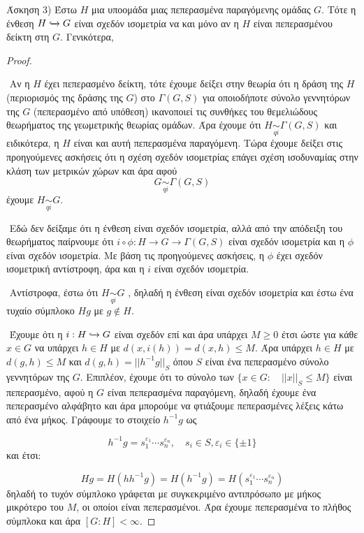 \documentclass[oneside,a4paper]{article}
\begin{document}
\noindent Άσκηση 3) Έστω $H$ μια υποομάδα μιας πεπερασμένα παραγόμενης ομάδας $G$. Τότε η ένθεση $H\xhookrightarrow{} G$ είναι σχεδόν ισομετρία να και μόνο αν η $H$ είναι πεπερασμένου δείκτη στη $G$. Γενικότερα,

\begin{proof} $ $

$ $\newline
Αν η $H$ έχει πεπερασμένο δείκτη, τότε έχουμε δείξει στην θεωρία ότι η δράση της $H$ (περιορισμός της δράσης της $G$) στο $\Gamma(G,S)$ για οποιοδήποτε σύνολο γεννητόρων της $G$ (πεπερασμένο από υπόθεση) ικανοποιεί τις συνθήκες του θεμελιώδους θεωρήματος της γεωμετρικής θεωρίας ομάδων. Άρα έχουμε ότι $H \underset{qi}{\sim} \Gamma(G,S)$ και ειδικότερα, η $H$ είναι και αυτή πεπερασμένα παραγόμενη. Τώρα έχουμε δείξει στις προηγούμενες ασκήσεις ότι η σχέση σχεδόν ισομετρίας επάγει σχέση ισοδυναμίας στην κλάση των μετρικών χώρων και άρα αφού
$$G \underset{qi}{\sim}\Gamma(G,S)$$ έχουμε $H \underset{qi}{\sim} G$.

$ $\newline
Εδώ δεν δείξαμε ότι η ένθεση είναι σχεδόν ισομετρία, αλλά από την απόδειξη του θεωρήματος παίρνουμε ότι $i \circ \phi : H \rightarrow G \rightarrow \Gamma(G,S)$ είναι σχεδόν ισομετρία και η $\phi$ είναι σχεδόν ισομετρία. Με βάση τις προηγούμενες ασκήσεις, η $\phi$ έχει σχεδόν ισομετρική αντίστροφη, άρα και η $i$ είναι σχεδόν ισομετρία.

$ $\newline
Αντίστροφα, έστω ότι $H \underset{qi}{\sim} G$ , δηλαδή η ένθεση είναι σχεδόν ισομετρία και έστω ένα τυχαίο σύμπλοκο $Hg$ με $g \not\in H$.

$ $\newline
Έχουμε ότι η $i: H \xhookrightarrow{}G$ είναι σχεδόν επί και άρα υπάρχει $M \geq 0$ έτσι ώστε για κάθε $x \in G$ να υπάρχει $h \in H$ με $d(x,i(h)) = d(x,h) \leq M$. Άρα υπάρχει $h \in H$ με $d(g,h) \leq M$ και $d(g,h) = ||h^{-1}g||_S$ όπου $S$ είναι ένα πεπερασμένο σύνολο γεννητόρων της $G$. Επιπλέον, έχουμε ότι το σύνολο των $\{x \in G: \quad ||x||_S \leq M\}$ είναι πεπερασμένο, αφού η $G$ είναι πεπερασμένα παραγόμενη, δηλαδή έχουμε ένα πεπερασμένο αλφάβητο και άρα μπορούμε να φτιάξουμε πεπερασμένες λέξεις κάτω από ένα μήκος. Γράφουμε το στοιχείο $h^{-1}g$ ως

$$h^{-1}g = s^{\varepsilon_1}_1 \cdots s^{\varepsilon_n}_n, \quad s_i \in S, \varepsilon_i \in \{\pm 1\} $$ και έτσι:

$$Hg = H (hh^{-1} g) = H(h^{-1}g) = H(s^{\varepsilon_1}_1 \cdots s^{\varepsilon_n}_n)$$ δηλαδή το τυχόν σύμπλοκο γράφεται με συγκεκριμένο αντιπρόσωπο με μήκος μικρότερο του $M$, οι οποίοι είναι πεπερασμένοι. Άρα έχουμε πεπερασμένα το πλήθος σύμπλοκα και άρα $[G:H]< \infty$.



\end{proof}
\end{document}
